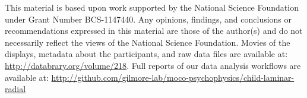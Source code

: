 \documentclass[landscape,final,paperwidth=60in,paperheight=39in,fontscale=0.285]{baposter}
\begin{document}
\begin{poster}
    {
      This material is based upon work supported by the National Science Foundation under Grant Number BCS-1147440. Any opinions, findings, and conclusions or recommendations expressed in this material are those of the author(s) and do not necessarily reflect the views of the National Science Foundation.
    }
    {
       Movies of the displays, metadata about the participants, and raw data files are available at: \url{http://databrary.org/volume/218}. Full reports of our data analysis workflows are available at: \url{http://github.com/gilmore-lab/moco-psychophysics/child-laminar-radial}
     }

  {
  \tiny
          \renewcommand{\refname}{\vspace{-0.5em}} %
          
          
}
\end{poster}
\end{document}
